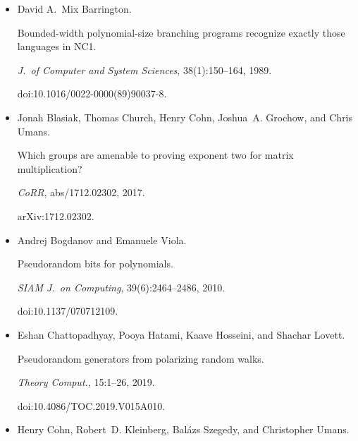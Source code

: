 \begin{itemize}
In \emph{37th IEEE Symp. on Foundations of Computer Science (FOCS)},
pages 412–421, 1996.


doi:10.1109/SFCS.1996.548500.





\item[] 
[6]

David A. Mix Barrington.


Bounded-width polynomial-size branching programs recognize exactly
those languages in NC1.


\emph{J. of Computer and System Sciences}, 38(1):150–164, 1989.


doi:10.1016/0022-0000(89)90037-8.





\item[] 
[7]

Jonah Blasiak, Thomas Church, Henry Cohn, Joshua A. Grochow, and Chris Umans.


Which groups are amenable to proving exponent two for matrix
multiplication?


\emph{CoRR}, abs/1712.02302, 2017.


arXiv:1712.02302.





\item[] 
[8]

Andrej Bogdanov and Emanuele Viola.


Pseudorandom bits for polynomials.


\emph{SIAM J. on Computing}, 39(6):2464–2486, 2010.


doi:10.1137/070712109.





\item[] 
[9]

Eshan Chattopadhyay, Pooya Hatami, Kaave Hosseini, and Shachar Lovett.


Pseudorandom generators from polarizing random walks.


\emph{Theory Comput.}, 15:1–26, 2019.


doi:10.4086/TOC.2019.V015A010.





\item[] 
[10]

Henry Cohn, Robert D. Kleinberg, Balázs Szegedy, and Christopher Umans.



\end{itemize}
